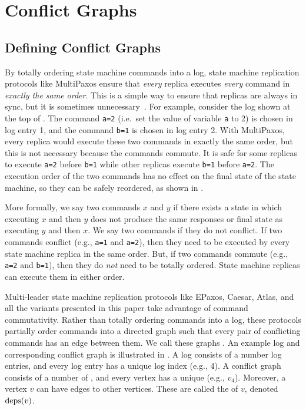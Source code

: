 
\section{Conflict Graphs}
\subsection{Defining Conflict Graphs}
By totally ordering state machine commands into a log, state machine
replication protocols like MultiPaxos ensure that \emph{every} replica executes
\emph{every} command in \emph{exactly the same order}. This is a simple way to
ensure that replicas are always in sync, but it is sometimes
unnecessary~\cite{lamport2005generalized}. For example, consider the log shown
at the top of . The command \texttt{a=2} (i.e.\ set the
value of variable \texttt{a} to 2) is chosen in log entry 1, and the command
\texttt{b=1} is chosen in log entry 2. With MultiPaxos, every replica would
execute these two commands in exactly the same order, but this is not necessary
because the commands commute. It is safe for some replicas to execute
\texttt{a=2} before \texttt{b=1} while other replicas execute \texttt{b=1}
before \texttt{a=2}. The execution order of the two commands has no effect on
the final state of the state machine, so they can be safely reordered, as shown
in .

{}

More formally, we say two commands $x$ and $y$  if there
exists a state in which executing $x$ and then $y$ does not produce the same
responses or final state as executing $y$ and then $x$. We say two commands
 if they do not conflict. If two commands conflict (e.g.,
\texttt{a=1} and \texttt{a=2}), then they need to be executed by every state
machine replica in the same order. But, if two commands commute (e.g.,
\texttt{a=2} and \texttt{b=1}), then they do \emph{not} need to be totally
ordered. State machine replicas can execute them in either order.

Multi-leader state machine replication protocols like EPaxos, Caesar, Atlas,
and all the \BPaxos{} variants presented in this paper take advantage of
command commutativity. Rather than totally ordering commands into a log, these
protocols partially order commands into a directed graph such that every pair
of conflicting commands has an edge between them. We call these graphs
. An example log and corresponding conflict graph is
illustrated in . A log consists of a number log entries,
and every log entry has a unique log index (e.g., 4). A conflict graph consists
of a number of , and every vertex has a unique
 (e.g., $v_4$). Moreover, a vertex $v$ can have edges to
other vertices. These are called the  of $v$, denoted
$\text{deps}(v)$.

